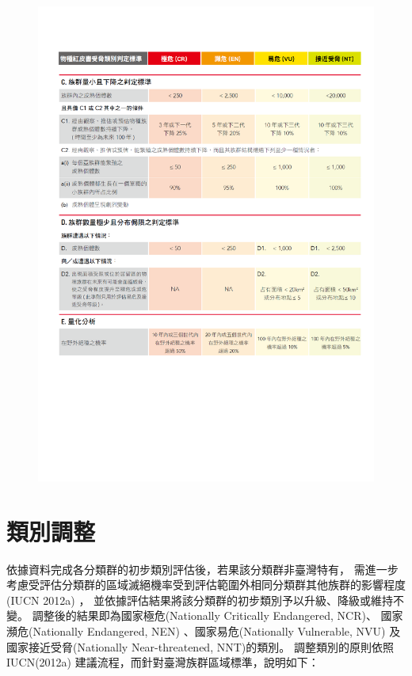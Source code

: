 \begin{figure}[!ht]
\includegraphics[scale=0.9]{iucn_standards2.pdf}
\end{figure}
\clearpage
\section{類別調整}
\begin{multicols}{2}
依據資料完成各分類群的初步類別評估後，若果該分類群非臺灣特有，
需進一步考慮受評估分類群的區域滅絕機率受到評估範圍外相同分類群其他族群的影響程度(IUCN 2012a) ，
並依據評估結果將該分類群的初步類別予以升級、降級或維持不變。
調整後的結果即為國家極危(Nationally Critically Endangered, NCR)、
國家瀕危(Nationally Endangered, NEN) 、國家易危(Nationally Vulnerable, NVU)
及國家接近受脅(Nationally Near-threatened, NNT)的類別。
調整類別的原則依照IUCN(2012a) 建議流程，而針對臺灣族群區域標準，說明如下：
\end{multicols}

